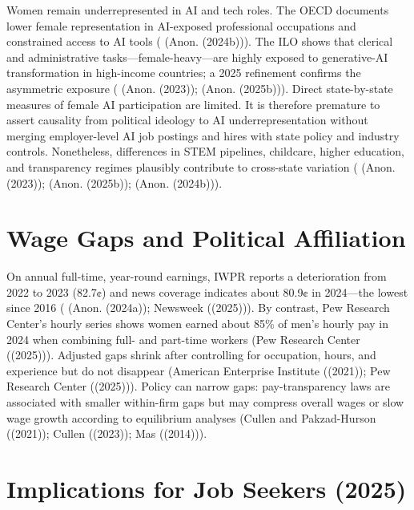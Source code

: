 \documentclass[
  letterpaper,
  DIV=11,
  numbers=noendperiod]{scrartcl}
\begin{document}
Women remain underrepresented in AI and tech roles. The OECD documents
lower female representation in AI-exposed professional occupations and
constrained access to AI tools ( (Anon. (2024b))). The ILO shows that
clerical and administrative tasks---female-heavy---are highly exposed to
generative-AI transformation in high-income countries; a 2025 refinement
confirms the asymmetric exposure ( (Anon. (2023)); (Anon. (2025b))).
Direct state-by-state measures of female AI participation are limited.
It is therefore premature to assert causality from political ideology to
AI underrepresentation without merging employer-level AI job postings
and hires with state policy and industry controls. Nonetheless,
differences in STEM pipelines, childcare, higher education, and
transparency regimes plausibly contribute to cross-state variation (
(Anon. (2023)); (Anon. (2025b)); (Anon. (2024b))).

\section{Wage Gaps and Political
Affiliation}\label{wage-gaps-and-political-affiliation}

On annual full-time, year-round earnings, IWPR reports a deterioration
from 2022 to 2023 (82.7¢) and news coverage indicates about 80.9¢ in
2024---the lowest since 2016 ( (Anon. (2024a)); Newsweek ((2025))). By
contrast, Pew Research Center's hourly series shows women earned about
85\% of men's hourly pay in 2024 when combining full- and part-time
workers (Pew Research Center ((2025))). Adjusted gaps shrink after
controlling for occupation, hours, and experience but do not disappear
(American Enterprise Institute ((2021)); Pew Research Center ((2025))).
Policy can narrow gaps: pay-transparency laws are associated with
smaller within-firm gaps but may compress overall wages or slow wage
growth according to equilibrium analyses (Cullen and Pakzad-Hurson
((2021)); Cullen ((2023)); Mas ((2014))).

\section{Implications for Job Seekers
(2025)}\label{implications-for-job-seekers-2025}
\end{document}
